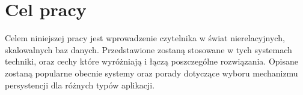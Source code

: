 \section{Cel pracy}

Celem niniejszej pracy jest wprowadzenie czytelnika w świat nierelacyjnych, skalowalnych baz danych.
Przedstawione zostaną stosowane w tych systemach techniki, oraz cechy które wyróżniają i łączą poszczególne rozwiązania.
Opisane zostaną popularne obecnie systemy oraz porady dotyczące wyboru mechanizmu persystencji dla różnych typów aplikacji.